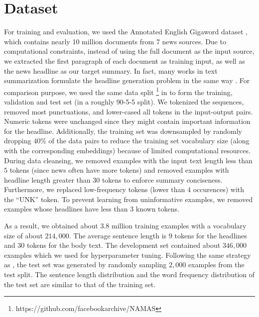 \section{Dataset}
\label{sec: dataset}

For training and evaluation, we used the Annotated English Gigaword dataset \cite{graff2003english}, which contains nearly 10 million documents from 7 news sources. Due to computational constraints, instead of using the full document as the input source, we extracted the first paragraph of each document as training input, as well as the news headline as our target summary. In fact, many works in text summarization formulate the headline generation problem in the same way \cite{rush2015neural}. For comparison purpose, we used the same data split \footnote{https://github.com/facebookarchive/NAMAS} in \cite{rush2015neural} to form the training, validation and test set (in a roughly 90-5-5 split). We tokenized the sequences, removed most punctuations, and lower-cased all tokens in the input-output pairs. Numeric tokens were unchanged since they might contain important information for the headline. Additionally, the training set was downsampled by randomly dropping $40\%$ of the data pairs to reduce the training set vocabulary size (along with the corresponding embeddings) because of limited computational resources. During data cleansing, we removed examples with the input text length less than $5$ tokens (since news often have more tokens) and removed examples with headline length greater than $30$ tokens to enforce summary conciseness. Furthermore, we replaced low-frequency tokens (lower than $4$ occurences) with the ``UNK'' token. To prevent learning from uninformative examples, we removed examples whose headlines have less than $3$ known tokens. 

As a result, we obtained about $3.8$ million training examples with a vocabulary size of about $214,000$. The average sentence length is $9$ tokens for the headlines and $30$ tokens for the body text. The development set contained about $346,000$ examples which we used for hyperparameter tuning. Following the same strategy as \cite{rush2015neural}, the test set was generated by randomly sampling $2,000$ examples from the test split. The sentence length distribution and the word frequency distribution of the test set are similar to that of the training set.
